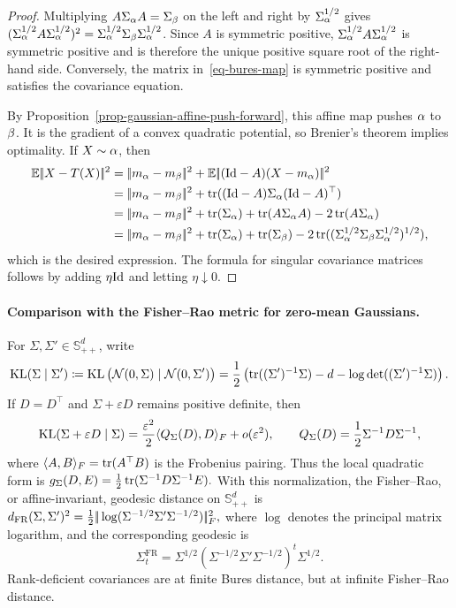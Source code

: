 \begin{proof}
Multiplying $A\Sigma_\alpha A=\Sigma_\beta$ on the left and right by $\Sigma_\alpha^{1/2}$ gives
$(\Sigma_\alpha^{1/2}A\Sigma_\alpha^{1/2})^2
=\Sigma_\alpha^{1/2}\Sigma_\beta\Sigma_\alpha^{1/2}$.
Since $A$ is symmetric positive, $\Sigma_\alpha^{1/2}A\Sigma_\alpha^{1/2}$ is symmetric positive and is therefore the unique positive square root of the right-hand side. Conversely, the matrix in~\eqref{eq-bures-map} is symmetric positive and satisfies the covariance equation.

By Proposition~\ref{prop-gaussian-affine-push-forward}, this affine map pushes $\alpha$ to $\beta$. It is the gradient of a convex quadratic potential, so Brenier's theorem implies optimality. If $X\sim\alpha$, then
\begin{align*}
\EE\norm{X-\T(X)}^2
&=
\norm{\mean_\al-\mean_\be}^2
+
\EE\norm{(\Id-A)(X-\mean_\al)}^2 \\
&=
\norm{\mean_\al-\mean_\be}^2
+
\tr((\Id-A)\cov_\al(\Id-A)^\top) \\
&=
\norm{\mean_\al-\mean_\be}^2
+
\tr(\cov_\al)+\tr(A\cov_\al A)-2\tr(A\cov_\al) \\
&=
\norm{\mean_\al-\mean_\be}^2
+
\tr(\cov_\al)+\tr(\cov_\be)
-2\tr((\cov_\al^{1/2}\cov_\be\cov_\al^{1/2})^{1/2}),
\end{align*}
which is the desired expression. The formula for singular covariance matrices follows by adding $\eta\mathrm{Id}$ and letting $\eta\downarrow0$.
\end{proof}
\paragraph{Comparison with the Fisher--Rao metric for zero-mean Gaussians.}
For $\Sigma,\Sigma'\in\mathbb S_{++}^d$, write
\[
\operatorname{KL}(\Sigma\mid\Sigma')
\coloneqq
\operatorname{KL}\big(\mathcal{N}(0,\Sigma)\mid\mathcal{N}(0,\Sigma')\big)
=
\frac12\left(
\operatorname{tr}((\Sigma')^{-1}\Sigma)-d-\log\det((\Sigma')^{-1}\Sigma)
\right).
\]
If $D=D^\top$ and $\Sigma+\varepsilon D$ remains positive definite, then
\[
\operatorname{KL}(\Sigma+\varepsilon D\mid\Sigma)
=
\frac{\varepsilon^2}{2}\langle Q_\Sigma(D),D\rangle_F+o(\varepsilon^2),
\qquad
Q_\Sigma(D)=\frac12\Sigma^{-1}D\Sigma^{-1},
\]
where $\langle A,B\rangle_F=\operatorname{tr}(A^\top B)$ is the Frobenius pairing. Thus the local quadratic form is \(g_\Sigma(D,E)=\frac12\operatorname{tr}(\Sigma^{-1}D\Sigma^{-1}E).\)
With this normalization, the Fisher--Rao, or affine-invariant, geodesic distance on $\mathbb S_{++}^d$ is \(d_{\mathrm{FR}}(\Sigma,\Sigma')^2 = \frac12 |\!| \log(\Sigma^{-1/2}\Sigma'\Sigma^{-1/2}) |\!|_F^2,\)
where $\log$ denotes the principal matrix logarithm, and the corresponding geodesic is
\[
\Sigma_t^{\mathrm{FR}}
=
\Sigma^{1/2}
\left(\Sigma^{-1/2}\Sigma'\Sigma^{-1/2}\right)^t
\Sigma^{1/2}.
\]
Rank-deficient covariances are at finite Bures distance, but at infinite Fisher--Rao distance.

